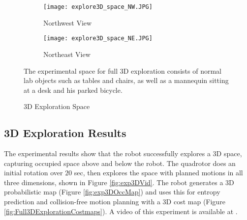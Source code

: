 \begin{figure}[!t]
\centering
    	\begin{subfigure}[t]{0.44\columnwidth}
           	\centering
          	\texttt{[image: explore3D\_space\_NW.JPG]}
        		\caption{Northwest View}
    	\end{subfigure}
	\hspace*{0.05\columnwidth}
    	\begin{subfigure}[t]{0.44\columnwidth}
           	\centering
          	\texttt{[image: explore3D\_space\_NE.JPG]}
        		\caption{Northeast View}
    	\end{subfigure}
	\caption{3D Exploration Space}
	\medskip
	\small
	The experimental space for full 3D exploration consists of normal lab objects such as tables and chairs, as well as a mannequin sitting at a desk and his parked bicycle.
	\label{fig:Full3DExplorationEnvironment}
\end{figure}

\subsection{3D Exploration Results}

The experimental results show that the robot successfully explores a 3D space, capturing occupied space above and below the robot. The quadrotor does an initial rotation over $20$ sec, then explores the space with planned motions in all three dimensions, shown in Figure \ref{fig:exp3DVid}. The robot generates a 3D probabilistic map (Figure \ref{fig:exp3DOccMap}) and uses this for entropy prediction and collision-free motion planning with a 3D cost map (Figure \ref{fig:Full3DExplorationCostmaps}). A video of this experiment is available at \href{https://www.youtube.com/watch?v=2Q2_-d8kNu0}{}.

